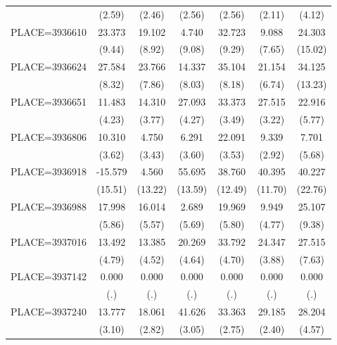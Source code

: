 {\begin{tabular}{l*{6}{c}}
                    &      (2.59)&      (2.46)&      (2.56)&      (2.56)&      (2.11)&      (4.12)\\
PLACE=3936610       &      23.373&      19.102&       4.740&      32.723&       9.088&      24.303\\
                    &      (9.44)&      (8.92)&      (9.08)&      (9.29)&      (7.65)&     (15.02)\\
PLACE=3936624       &      27.584&      23.766&      14.337&      35.104&      21.154&      34.125\\
                    &      (8.32)&      (7.86)&      (8.03)&      (8.18)&      (6.74)&     (13.23)\\
PLACE=3936651       &      11.483&      14.310&      27.093&      33.373&      27.515&      22.916\\
                    &      (4.23)&      (3.77)&      (4.27)&      (3.49)&      (3.22)&      (5.77)\\
PLACE=3936806       &      10.310&       4.750&       6.291&      22.091&       9.339&       7.701\\
                    &      (3.62)&      (3.43)&      (3.60)&      (3.53)&      (2.92)&      (5.68)\\
PLACE=3936918       &     -15.579&       4.560&      55.695&      38.760&      40.395&      40.227\\
                    &     (15.51)&     (13.22)&     (13.59)&     (12.49)&     (11.70)&     (22.76)\\
PLACE=3936988       &      17.998&      16.014&       2.689&      19.969&       9.949&      25.107\\
                    &      (5.86)&      (5.57)&      (5.69)&      (5.80)&      (4.77)&      (9.38)\\
PLACE=3937016       &      13.492&      13.385&      20.269&      33.792&      24.347&      27.515\\
                    &      (4.79)&      (4.52)&      (4.64)&      (4.70)&      (3.88)&      (7.63)\\
PLACE=3937142       &       0.000&       0.000&       0.000&       0.000&       0.000&       0.000\\
                    &         (.)&         (.)&         (.)&         (.)&         (.)&         (.)\\
PLACE=3937240       &      13.777&      18.061&      41.626&      33.363&      29.185&      28.204\\
                    &      (3.10)&      (2.82)&      (3.05)&      (2.75)&      (2.40)&      (4.57)\\

\end{tabular}}
